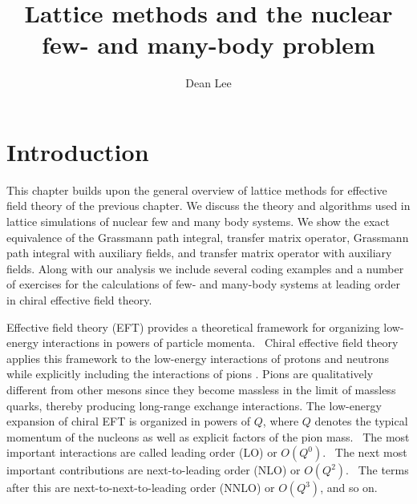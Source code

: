 \title{Lattice methods and the nuclear few- and many-body problem}
\author{Dean Lee}
\maketitle



\section{Introduction}
This chapter builds upon the general overview of lattice methods for effective field theory of the previous chapter. We discuss the theory and algorithms used in lattice simulations of nuclear
few and many body systems.  We show the exact equivalence of the Grassmann path integral, transfer matrix operator, Grassmann path
integral with auxiliary fields, and transfer matrix operator with auxiliary
fields.  Along with our analysis we include several coding examples and a number of exercises for the calculations of few- and many-body systems at leading order in chiral effective field theory.


Effective field theory (EFT) provides a theoretical framework for organizing low-energy
interactions in powers of particle
momenta. \ Chiral
effective field theory   applies this framework to the low-energy interactions of protons and neutrons while explicitly including the interactions of pions \cite{Weinberg:1990rz,Weinberg:1991um,Ordonez:1992xp,Ordonez:1993tn,vanKolck:1994yi,Epelbaum:1998hg,Epelbaum:1998ka,Bedaque:2002mn,Epelbaum:2008ga}.
Pions are qualitatively different from other mesons since they become massless in the limit of massless quarks, thereby producing long-range exchange interactions. The low-energy expansion of chiral EFT is organized
in powers of $Q$, where $Q$ denotes the typical momentum of the nucleons as well as explicit factors of the pion mass. \ The most important interactions are called
leading order (LO) or $O(Q^{0})$. \ The next most important contributions
are 
next-to-leading order (NLO) or $O(Q^{2})$. \ The terms after this are
next-to-next-to-leading order (NNLO) or $O(Q^{3})$, and so on. 

